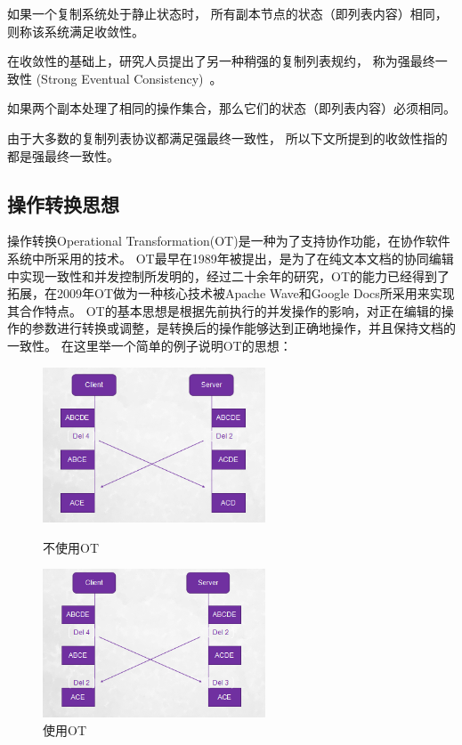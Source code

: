 \begin{definition}
  如果一个复制系统处于静止状态时，
  所有副本节点的状态（即列表内容）相同，
  则称该系统满足收敛性。
\end{definition}

在收敛性的基础上，研究人员提出了另一种稍强的复制列表规约，
称为强最终一致性 (Strong Eventual Consistency)~\cite{Shapiro:SSS11}。
\begin{definition}
  如果两个副本处理了相同的操作集合，那么它们的状态（即列表内容）必须相同。
\end{definition}

由于大多数的复制列表协议都满足强最终一致性，
所以下文所提到的收敛性指的都是强最终一致性。

\subsection{操作转换思想}
操作转换Operational Transformation(OT)是一种为了支持协作功能，在协作软件系统中所采用的技术。
OT最早在1989年被提出，是为了在纯文本文档的协同编辑中实现一致性和并发控制所发明的，经过二十余年的研究，OT的能力已经得到了拓展，在2009年OT做为一种核心技术被Apache Wave和Google Docs所采用来实现其合作特点。
OT的基本思想是根据先前执行的并发操作的影响，对正在编辑的操作的参数进行转换或调整，是转换后的操作能够达到正确地操作，并且保持文档的一致性。
在这里举一个简单的例子说明OT的思想：

\begin{figure}[H]
\begin{minipage}[t]{0.5\linewidth}
\centering
\includegraphics[width=2.6in]{figures/exm1.bmp}
\caption{不使用OT}
\label{fig:side:a}
\end{minipage}%
\begin{minipage}[t]{0.5\linewidth}
\centering
\includegraphics[width=2.6in]{figures/exm2.bmp}
\caption{使用OT}
\label{fig:side:b}
\end{minipage}
\end{figure}

